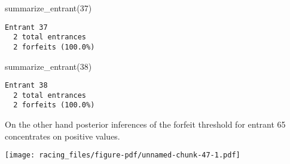 \documentclass[
  letterpaper,
  DIV=11,
  numbers=noendperiod]{scrartcl}
\newenvironment{Shaded}{\begin{snugshade}}{\end{snugshade}}
\newcommand{\AttributeTok}[1]{\textcolor[rgb]{0.40,0.45,0.13}{#1}}
\newcommand{\DecValTok}[1]{\textcolor[rgb]{0.68,0.00,0.00}{#1}}
\newcommand{\FunctionTok}[1]{\textcolor[rgb]{0.28,0.35,0.67}{#1}}
\newcommand{\NormalTok}[1]{\textcolor[rgb]{0.00,0.23,0.31}{#1}}
\newcommand{\OtherTok}[1]{\textcolor[rgb]{0.00,0.23,0.31}{#1}}
\newcommand{\SpecialCharTok}[1]{\textcolor[rgb]{0.37,0.37,0.37}{#1}}
\newcommand{\StringTok}[1]{\textcolor[rgb]{0.13,0.47,0.30}{#1}}
\begin{document}
\begin{Shaded}
\begin{Highlighting}[]
\FunctionTok{summarize\_entrant}\NormalTok{(}\DecValTok{37}\NormalTok{)}
\end{Highlighting}
\end{Shaded}

\begin{verbatim}
Entrant 37
  2 total entrances
  2 forfeits (100.0%)
\end{verbatim}

\begin{Shaded}
\begin{Highlighting}[]
\FunctionTok{summarize\_entrant}\NormalTok{(}\DecValTok{38}\NormalTok{)}
\end{Highlighting}
\end{Shaded}

\begin{verbatim}
Entrant 38
  2 total entrances
  2 forfeits (100.0%)
\end{verbatim}

On the other hand posterior inferences of the forfeit threshold for
entrant 65 concentrates on positive values.

\begin{Shaded}
\end{Shaded}

\texttt{[image: racing\_files/figure-pdf/unnamed-chunk-47-1.pdf]}
\end{document}
